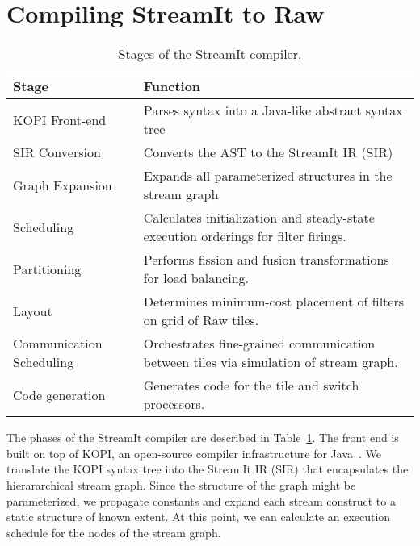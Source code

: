 \section{Compiling StreamIt to Raw}
\label{sec:phases}

\begin{table}[t]
\begin{center}
\scriptsize
\begin{tabular}{|l|l|} \hline
Stage & Function \\
\hline \hline
KOPI Front-end & Parses syntax into a Java-like abstract syntax tree \\
\hline
SIR Conversion & Converts the AST to the StreamIt IR (SIR) \\
\hline
Graph Expansion & Expands all parameterized structures in the stream graph \\
\hline
Scheduling & Calculates initialization and steady-state execution orderings for filter firings. \\
\hline
Partitioning & Performs fission and fusion transformations for load balancing. \\
\hline
Layout & Determines minimum-cost placement of filters on grid of Raw tiles. \\
\hline
Communication Scheduling & Orchestrates fine-grained communication between tiles via simulation of stream graph. \\
\hline
Code generation & Generates code for the tile and switch processors. \\
\hline
\end{tabular}
\vspace{-6pt}
\caption{\protect\small Stages of the StreamIt compiler.
\label{tab:stages}}
\vspace{-12pt}
\end{center}
\end{table}

The phases of the StreamIt compiler are described in
Table~\ref{tab:stages}.  The front end is built on top of KOPI, an
open-source compiler infrastructure for Java~\cite{kopi}.  We
translate the KOPI syntax tree into the StreamIt IR (SIR) that
encapsulates the hierararchical stream graph.  Since the structure of
the graph might be parameterized, we propagate constants and expand
each stream construct to a static structure of known extent.  At this
point, we can calculate an execution schedule for the nodes of the
stream graph.

